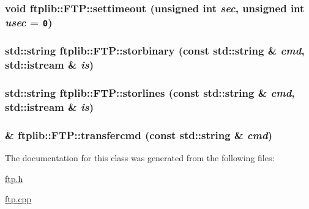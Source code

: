\hypertarget{classftplib_1_1FTP_5e1c861ff05a0e2ecc0d49d81ba73c5a}{
\subsubsection[{settimeout}]{\setlength{\rightskip}{0pt plus 5cm}void ftplib::FTP::settimeout (unsigned int {\em sec}, \/  unsigned int {\em usec} = {\tt 0})}}
\label{classftplib_1_1FTP_5e1c861ff05a0e2ecc0d49d81ba73c5a}


\hypertarget{classftplib_1_1FTP_37c828c7d98c7da3fe3b936526118416}{
\subsubsection[{storbinary}]{\setlength{\rightskip}{0pt plus 5cm}std::string ftplib::FTP::storbinary (const std::string \& {\em cmd}, \/  std::istream \& {\em is})}}
\label{classftplib_1_1FTP_37c828c7d98c7da3fe3b936526118416}


\hypertarget{classftplib_1_1FTP_956c5fa0546d7a6a2db0b4dee28f6868}{
\subsubsection[{storlines}]{\setlength{\rightskip}{0pt plus 5cm}std::string ftplib::FTP::storlines (const std::string \& {\em cmd}, \/  std::istream \& {\em is})}}
\label{classftplib_1_1FTP_956c5fa0546d7a6a2db0b4dee28f6868}


\hypertarget{classftplib_1_1FTP_c949b3cd7b92534705ff041bb43d989b}{
\subsubsection[{transfercmd}]{ \& ftplib::FTP::transfercmd (const std::string \& {\em cmd})}}
\label{classftplib_1_1FTP_c949b3cd7b92534705ff041bb43d989b}




The documentation for this class was generated from the following files:\begin{CompactItemize}
\item 
\hyperlink{ftp_8h}{ftp.h}\item 
\hyperlink{ftp_8cpp}{ftp.cpp}\end{CompactItemize}
